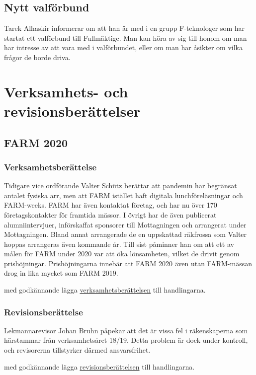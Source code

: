 \documentclass[hidelinks]{sektionsmote}
\begin{document}
\subsection{Nytt valförbund}
Tarek Alhaskir informerar om att han är med i en grupp F-teknologer som har startat ett valförbund till Fullmäktige.
Man kan höra av sig till honom om man har intresse av att vara med i valförbundet, eller om man har åsikter om vilka frågor de borde driva.


\section{Verksamhets- och revisionsberättelser}
\subsection{FARM 2020}
\subsubsection{Verksamhetsberättelse}
Tidigare vice ordförande Valter Schütz berättar att pandemin har begränsat antalet fysiska arr, men att FARM istället haft digitala lunchföreläsningar och FARM-weeks.
FARM har även kontaktat företag, och har nu över 170 företagskontakter för framtida mässor.
I övrigt har de även publicerat alumniintervjuer, införskaffat sponsorer till Mottagningen och arrangerat under Mottagningen.
Bland annat arrangerade de en uppskattad räkfrossa som Valter hoppas arrangeras även kommande år.
Till sist påminner han om att ett av målen för FARM under 2020 var att öka lönsamheten, vilket de drivit genom prishöjningar.
Prishöjningarna innebär att FARM 2020 även utan FARM-mässan drog in lika mycket som FARM 2019.

\begin{beslut}
  \item med godkännande lägga \hyperlink{bilagor/farm/vb.pdf.1}{verksamhetsberättelsen} till handlingarna.
\end{beslut}


\subsubsection{Revisionsberättelse}
Lekmannarevisor Johan Bruhn påpekar att det är vissa fel i räkenskaperna som härstammar från verksamhetsåret 18/19.
Detta problem är dock under kontroll, och revisorerna tillstyrker därmed ansvarsfrihet.

\begin{beslut}
  \item med godkännande lägga \hyperlink{bilagor/farm/rb.pdf.1}{revisionsberättelsen} till handlingarna.
\end{beslut}
\end{document}
